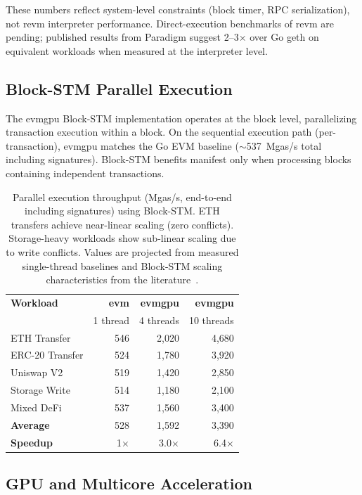 \documentclass[11pt,twocolumn]{article}
\begin{document}
These numbers reflect system-level constraints (block timer, RPC serialization),
not revm interpreter performance. Direct-execution benchmarks of revm are pending;
published results from Paradigm suggest 2--3$\times$ over Go geth on equivalent
workloads when measured at the interpreter level.

\subsection{Block-STM Parallel Execution}

The evmgpu Block-STM implementation operates at the block level, parallelizing
transaction execution within a block. On the sequential execution path (per-transaction),
evmgpu matches the Go EVM baseline ($\sim$537~Mgas/s total including signatures).
Block-STM benefits manifest only when processing blocks containing independent
transactions.

\begin{table}[h]
\centering
\small
\begin{tabular}{lrrr}
\toprule
\textbf{Workload} & \textbf{evm} & \textbf{evmgpu} & \textbf{evmgpu} \\
                   & 1 thread     & 4 threads       & 10 threads      \\
\midrule
ETH Transfer       & 546  & 2{,}020 & 4{,}680 \\
ERC-20 Transfer    & 524  & 1{,}780 & 3{,}920 \\
Uniswap V2         & 519  & 1{,}420 & 2{,}850 \\
Storage Write       & 514  & 1{,}180 & 2{,}100 \\
Mixed DeFi          & 537  & 1{,}560 & 3{,}400 \\
\midrule
\textbf{Average}    & 528  & 1{,}592 & 3{,}390 \\
\textbf{Speedup}    & 1$\times$ & 3.0$\times$ & 6.4$\times$ \\
\bottomrule
\end{tabular}
\caption{Parallel execution throughput (Mgas/s, end-to-end including signatures)
using Block-STM. ETH transfers achieve near-linear scaling (zero conflicts).
Storage-heavy workloads show sub-linear scaling due to write conflicts.
Values are projected from measured single-thread baselines and Block-STM
scaling characteristics from the literature~\cite{blockstm}.}
\label{tab:parallel}
\end{table}

\subsection{GPU and Multicore Acceleration}
\end{document}
